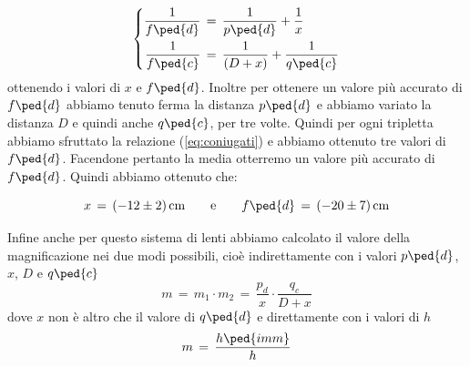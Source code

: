 \begin{equation}
 \left\{
  \begin{aligned}
    \frac{1}{f\ped{d}} & \,=\, \frac{1}{p\ped{d}} + \frac{1}{x}\\
    \frac{1}{f\ped{c}} & \,=\, \frac{1}{(D + x)} + \frac{1}{q\ped{c}}
  \end{aligned}
\right.
\end{equation}
%
ottenendo i valori di $x$ e $f\ped{d}$. Inoltre per ottenere un valore più accurato di $f\ped{d}$ abbiamo tenuto ferma la distanza $p\ped{d}$ e abbiamo variato la distanza $D$ e quindi anche $q\ped{c}$, per tre volte. Quindi per ogni tripletta abbiamo sfruttato la relazione (\ref{eq:coniugati}) e abbiamo ottenuto tre valori di $f\ped{d}$. Facendone pertanto la media otterremo un valore più accurato di $f\ped{d}$.
Quindi abbiamo ottenuto che: %

\begin{equation}
	x \,=\, (-12 \pm 2) \,\text{cm} \qquad \text{e} \qquad f\ped{d} \,=\, (-20 \pm 7) \,\text{cm}
\end{equation}

Infine anche per questo sistema di lenti abbiamo calcolato il valore della magnificazione nei due modi possibili, cioè indirettamente con i valori $p\ped{d}$, $x$, $D$ e $q\ped{c}$
\begin{equation}
	m \,=\, m_1 \cdot m_2 \,=\, \frac{p_d}{x} \cdot \frac{q_c}{D+x}
\end{equation} %
dove $x$ non è altro che il valore di $q\ped{d}$ e direttamente con i valori di $h$
\begin{equation}
	m \,=\, \frac{h\ped{imm}}{h}
\end{equation}



